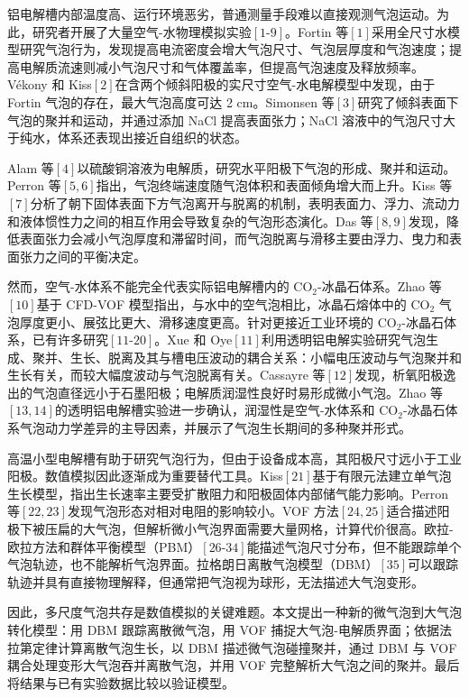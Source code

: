\documentclass[UTF8,zihao=-4,fontset=fandol]{ctexart}
\begin{document}
铝电解槽内部温度高、运行环境恶劣，普通测量手段难以直接观测气泡运动。为此，研究者开展了大量空气-水物理模拟实验\([1\text{-}9]\)。Fortin 等\([1]\)采用全尺寸水模型研究气泡行为，发现提高电流密度会增大气泡尺寸、气泡层厚度和气泡速度；提高电解质流速则减小气泡尺寸和气体覆盖率，但提高气泡速度及释放频率。V\'ekony 和 Kiss\([2]\)在含两个倾斜阳极的实尺寸空气-水电解模型中发现，由于 Fortin 气泡的存在，最大气泡高度可达 2 cm。Simonsen 等\([3]\)研究了倾斜表面下气泡的聚并和运动，并通过添加 NaCl 提高表面张力；NaCl 溶液中的气泡尺寸大于纯水，体系还表现出接近自组织的状态。

Alam 等\([4]\)以硫酸铜溶液为电解质，研究水平阳极下气泡的形成、聚并和运动。Perron 等\([5,6]\)指出，气泡终端速度随气泡体积和表面倾角增大而上升。Kiss 等\([7]\)分析了朝下固体表面下方气泡离开与脱离的机制，表明表面力、浮力、流动力和液体惯性力之间的相互作用会导致复杂的气泡形态演化。Das 等\([8,9]\)发现，降低表面张力会减小气泡厚度和滞留时间，而气泡脱离与滑移主要由浮力、曳力和表面张力之间的平衡决定。

然而，空气-水体系不能完全代表实际铝电解槽内的 CO$_2$-冰晶石体系。Zhao 等\([10]\)基于 CFD-VOF 模型指出，与水中的空气泡相比，冰晶石熔体中的 CO$_2$ 气泡厚度更小、展弦比更大、滑移速度更高。针对更接近工业环境的 CO$_2$-冰晶石体系，已有许多研究\([11\text{-}20]\)。Xue 和 Oye\([11]\)利用透明铝电解实验研究气泡生成、聚并、生长、脱离及其与槽电压波动的耦合关系：小幅电压波动与气泡聚并和生长有关，而较大幅度波动与气泡脱离有关。Cassayre 等\([12]\)发现，析氧阳极逸出的气泡直径远小于石墨阳极；电解质润湿性良好时易形成微小气泡。Zhao 等\([13,14]\)的透明铝电解槽实验进一步确认，润湿性是空气-水体系和 CO$_2$-冰晶石体系气泡动力学差异的主导因素，并展示了气泡生长期间的多种聚并形式。

高温小型电解槽有助于研究气泡行为，但由于设备成本高，其阳极尺寸远小于工业阳极。数值模拟因此逐渐成为重要替代工具。Kiss\([21]\)基于有限元法建立单气泡生长模型，指出生长速率主要受扩散阻力和阳极固体内部储气能力影响。Perron 等\([22,23]\)发现气泡形态对相对电阻的影响较小。VOF 方法\([24,25]\)适合描述阳极下被压扁的大气泡，但解析微小气泡界面需要大量网格，计算代价很高。欧拉-欧拉方法和群体平衡模型（PBM）\([26\text{-}34]\)能描述气泡尺寸分布，但不能跟踪单个气泡轨迹，也不能解析气泡界面。拉格朗日离散气泡模型（DBM）\([35]\)可以跟踪轨迹并具有直接物理解释，但通常把气泡视为球形，无法描述大气泡变形。

因此，多尺度气泡共存是数值模拟的关键难题。本文提出一种新的微气泡到大气泡转化模型：用 DBM 跟踪离散微气泡，用 VOF 捕捉大气泡-电解质界面；依据法拉第定律计算离散气泡生长，以 DBM 描述微气泡碰撞聚并，通过 DBM 与 VOF 耦合处理变形大气泡吞并离散气泡，并用 VOF 完整解析大气泡之间的聚并。最后将结果与已有实验数据比较以验证模型。
\end{document}
